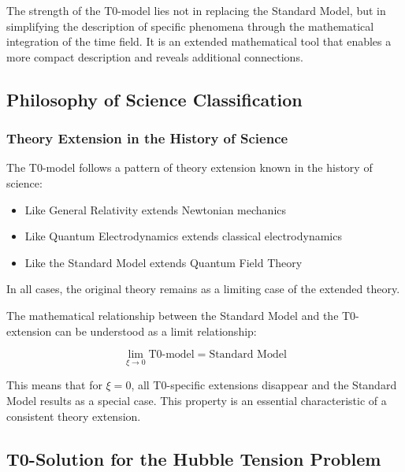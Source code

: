 \documentclass[12pt,a4paper]{article}
\theoremstyle{definition}
\begin{document}
	\begin{wichtig}
		The strength of the T0-model lies not in replacing the Standard Model, but in simplifying the description of specific phenomena through the mathematical integration of the time field. It is an extended mathematical tool that enables a more compact description and reveals additional connections.
	\end{wichtig}
	
	\subsection{Philosophy of Science Classification}
	
	\subsubsection{Theory Extension in the History of Science}
	
	The T0-model follows a pattern of theory extension known in the history of science:
	
	\begin{itemize}
		\item Like General Relativity extends Newtonian mechanics
		\item Like Quantum Electrodynamics extends classical electrodynamics
		\item Like the Standard Model extends Quantum Field Theory
	\end{itemize}
	
	In all cases, the original theory remains as a limiting case of the extended theory.
	
	\begin{verhaltnis}
		The mathematical relationship between the Standard Model and the T0-extension can be understood as a limit relationship:
		
		\begin{equation}
			\lim_{\xi \to 0} \text{T0-model} = \text{Standard Model}
		\end{equation}
		
		This means that for $\xi = 0$, all T0-specific extensions disappear and the Standard Model results as a special case. This property is an essential characteristic of a consistent theory extension.
	\end{verhaltnis}\subsection{T0-Solution for the Hubble Tension Problem}
	
\end{document}
